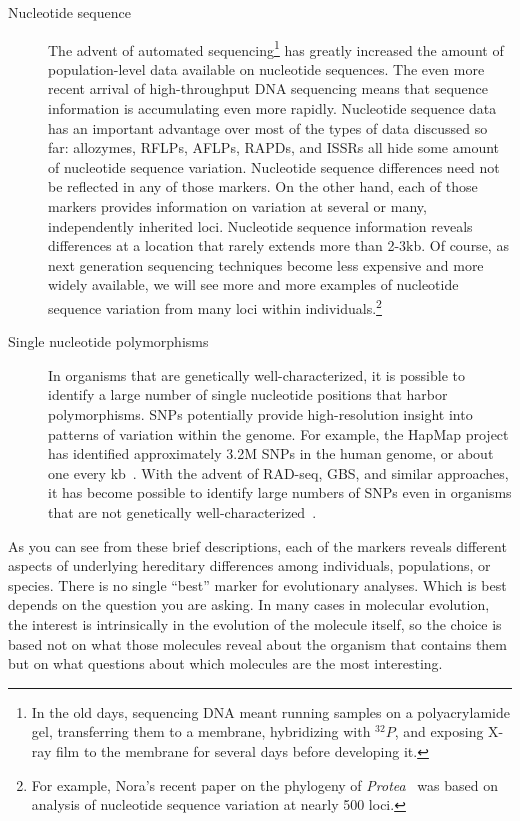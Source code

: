 \documentclass[12pt]{article}
\begin{document}
\begin{description}
\item[Nucleotide sequence] The advent of automated
  sequencing\footnote{In the old days, sequencing DNA meant running
    samples on a polyacrylamide gel, transferring them to a membrane,
    hybridizing with $^{32}P$, and exposing X-ray film to the membrane
    for several days before developing it.} has greatly increased the
  amount of population-level data available on nucleotide
  sequences. The even more recent arrival of high-throughput DNA
  sequencing means that sequence information is accumulating even more
  rapidly. Nucleotide sequence data has an important advantage over
  most of the types of data discussed so far: allozymes, RFLPs, AFLPs,
  RAPDs, and ISSRs all hide some amount of nucleotide sequence
  variation. Nucleotide sequence differences need not be reflected in
  any of those markers. On the other hand, each of those markers
  provides information on variation at several or many, independently
  inherited loci. Nucleotide sequence information reveals differences
  at a location that rarely extends more than 2-3kb. Of course, as
  next generation sequencing techniques become less expensive and more
  widely available, we will see more and more examples of nucleotide
  sequence variation from many loci within individuals.\footnote{For
    example, Nora's recent paper on the phylogeny of {\it
      Protea\/}~\cite{Mitchell-etal-2017} was based on analysis of
    nucleotide sequence variation at nearly 500 loci.}

\item[Single nucleotide polymorphisms] In organisms that are
  genetically well-characterized, it is possible to identify a large
  number of single nucleotide positions that harbor
  polymorphisms. SNPs potentially provide high-resolution insight into
  patterns of variation within the genome. For example, the HapMap
  project has identified approximately 3.2M SNPs in the human genome,
  or about one every kb~\cite{HapMap-2007}. With the advent of
  RAD-seq, GBS, and similar approaches, it has become possible to
  identify large numbers of SNPs even in organisms that are not
  genetically
  well-characterized~\cite{Elshire-etal-2011,McKinney-etal-2017}.

\end{description}

As you can see from these brief descriptions, each of the markers
reveals different aspects of underlying hereditary differences among
individuals, populations, or species. There is no single ``best''
marker for evolutionary analyses. Which is best depends on the
question you are asking. In many cases in molecular evolution, the
interest is intrinsically in the evolution of the molecule itself, so
the choice is based not on what those molecules reveal about the
organism that contains them but on what questions about which
molecules are the most interesting.
\end{document}
